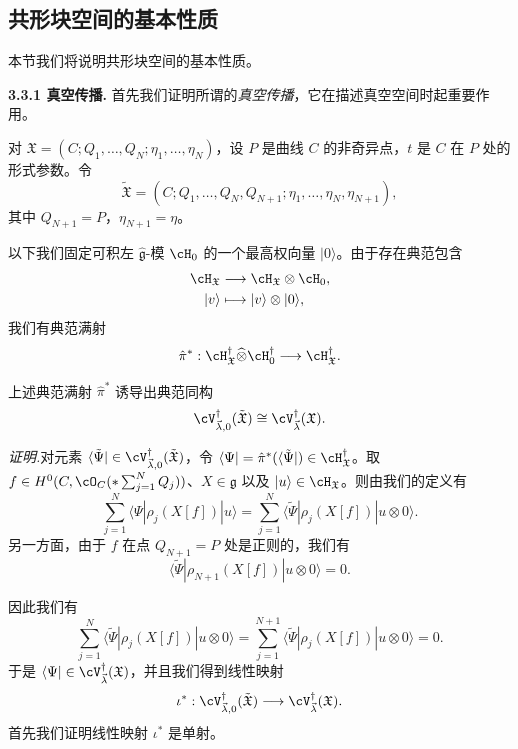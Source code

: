 \subsection{共形块空间的基本性质}

本节我们将说明共形块空间的基本性质。

\noindent\textbf{3.3.1 真空传播.}\quad
首先我们证明所谓的\emph{真空传播}，它在描述真空空间时起重要作用。

对 $\mathfrak{X}=(C;Q_1,\dots,Q_N;\eta_1,\dots,\eta_N)$，设 $P$ 是曲线 $C$ 的非奇异点，$t$ 是 $C$ 在 $P$ 处的形式参数。令
\[
\tilde{\mathfrak{X}}=(C;Q_1,\dots,Q_N,Q_{N+1};\eta_1,\dots,\eta_N,\eta_{N+1}),
\]
其中 $Q_{N+1}=P$，$\eta_{N+1}=\eta$。

以下我们固定可积左 $\hat{\mathfrak{g}}$-模 $\cH_0$ 的一个最高权向量 $|0\rangle$。由于存在典范包含
\[
\begin{aligned}
\cH_{\mathfrak{X}}&\longrightarrow\cH_{\mathfrak{X}}\otimes\cH_0,\\
|v\rangle&\longmapsto|v\rangle\otimes|0\rangle,
\end{aligned}
\]
我们有典范满射
\[
\hat\pi^*:\cH^{\dagger}_{\mathfrak{X}}\widehat{\otimes}\cH^{\dagger}_0\longrightarrow\cH^{\dagger}_{\mathfrak{X}}.
\]

\begin{theorem}[3.15]
上述典范满射 $\hat\pi^*$ 诱导出典范同构
\[
\cV^{\dagger}_{\vec{\lambda},0}(\tilde{\mathfrak{X}})\cong\cV^{\dagger}_{\vec{\lambda}}(\mathfrak{X}).
\]
\end{theorem}

\noindent\textit{证明.}\quad 对元素 $\langle\tilde\Psi|\in\cV^{\dagger}_{\vec{\lambda},0}(\tilde{\mathfrak{X}})$，令 $\langle\Psi|=\hat\pi^*(\langle\tilde\Psi|)\in\cH^{\dagger}_{\mathfrak{X}}$。取 $f\in H^0(C,\cO_C(*\sum_{j=1}^{N}Q_j))$、$X\in\mathfrak{g}$ 以及 $|u\rangle\in\cH_{\mathfrak{X}}$。则由我们的定义有
\[
\sum_{j=1}^{N}\langle\Psi|\rho_j(X[f])|u\rangle=\sum_{j=1}^{N}\langle\tilde\Psi|\rho_j(X[f])|u\otimes0\rangle.
\]
另一方面，由于 $f$ 在点 $Q_{N+1}=P$ 处是正则的，我们有
\[
\langle\tilde\Psi|\rho_{N+1}(X[f])|u\otimes0\rangle=0.
\]


因此我们有
\[
\sum_{j=1}^{N}\langle\tilde\Psi|\rho_j(X[f])|u\otimes0\rangle
=\sum_{j=1}^{N+1}\langle\tilde\Psi|\rho_j(X[f])|u\otimes0\rangle=0.
\]
于是 $\langle\Psi|\in\cV^{\dagger}_{\vec{\lambda}}(\mathfrak{X})$，并且我们得到线性映射
\[
\iota^*:\cV^{\dagger}_{\vec{\lambda},0}(\tilde{\mathfrak{X}})\longrightarrow\cV^{\dagger}_{\vec{\lambda}}(\mathfrak{X}).
\]
首先我们证明线性映射 $\iota^*$ 是单射。

